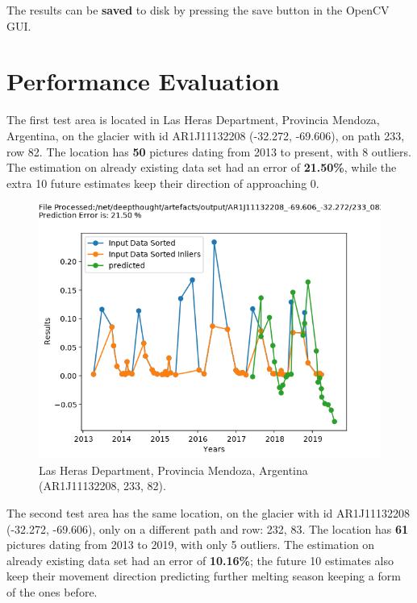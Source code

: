 \documentclass[12pt, a4paper]{report}
\begin{document}
	The results can be \textbf{saved} to disk by pressing the save button in the OpenCV GUI. 
	
	\newpage{}
	\chapter{Performance Evaluation} 
	The first test area is located in Las Heras Department, Provincia Mendoza, Argentina, on the glacier with id AR1J11132208 (-32.272, -69.606), on path 233, row 82. The location has \textbf{50} pictures dating from 2013 to present, with 8 outliers. The estimation on already existing data set had an error of \textbf{21.50\%}, while the extra 10 future estimates keep their direction of approaching 0.
	
	\begin{figure}[H]
		\centering
		\includegraphics[scale=0.5]{21.png}
		\caption{Las Heras Department, Provincia Mendoza, Argentina (AR1J11132208, 233, 82).}
		\label{fig:first}
	\end{figure}
	
	The second test area has the same location, on the glacier with id AR1J11132208 (-32.272, -69.606), only on a different path and row: 232, 83. The location has \textbf{61} pictures dating from 2013 to 2019, with only 5 outliers. The estimation on already existing data set had an error of \textbf{10.16\%}; the future 10 estimates also keep their movement direction predicting further melting season keeping a form of the ones before.
	
\end{document}
